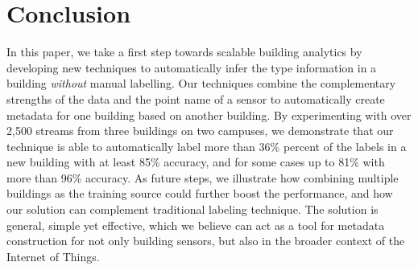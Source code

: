 \section{Conclusion}
In this paper, we take a first step towards scalable building analytics by
developing new techniques to automatically infer the type information in a building {\em
  without} manual labelling. 
Our techniques combine the complementary strengths of the data and the point name of a sensor 
to automatically create metadata for one building based on another building. 
By experimenting with over 2,500 streams from three buildings on two campuses, we demonstrate that 
our technique is able to automatically label more than 36\% percent of the labels in a new building with at least 85\% accuracy, and for some cases up to 81\% with more than 96\% accuracy.
As future steps, we illustrate how combining multiple buildings as the training source could further boost the performance, and how our solution can complement traditional labeling technique.
The solution is general, simple yet effective, which we believe can act as a tool for metadata construction for not only building sensors, but also in the broader context of the Internet of Things.

